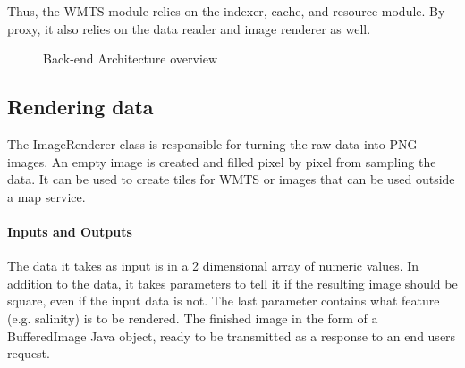 \documentclass[11pt,a4paper,titlepage,oneside]{report}
\begin{document}
Thus, the WMTS module relies on the indexer, cache, and resource module. By proxy, it also relies on the data reader and image renderer as well.

\begin{figure}[h]
\begin{center}
\caption{Back-end Architecture overview}
\label{fig:BackEndArchitecture}
\end{center}
\end{figure}


\subsection{Rendering data}
The ImageRenderer class is responsible for turning the raw data into \gls{PNG} images. An empty image is created and filled pixel by pixel from sampling the data. It can be used to create tiles for WMTS or images that can be used outside a map service.
\paragraph{Inputs and Outputs}
The data it takes as input is in a 2 dimensional array of numeric values. In addition to the data, it takes parameters to tell it if the resulting image should be square, even if the input data is not. The last parameter contains what feature (e.g. salinity) is to be rendered. The finished image in the form of a BufferedImage Java object, ready to be transmitted as a response to an end users request.
\end{document}
